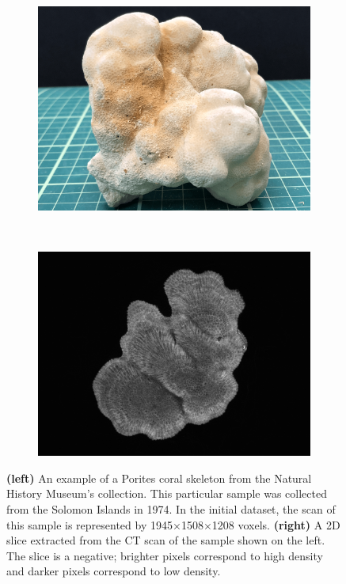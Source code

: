 \begin{figure}[t]
    \centering
    \begin{subfigure}[t]{0.49\textwidth}
        \centering
        \includegraphics[width=1\textwidth, valign=c]{images/real-coral.png}
    \end{subfigure}
    ~
    \begin{subfigure}[t]{0.49\textwidth}
        \centering
        \includegraphics[width=1\textwidth, valign=c]{images/slice-example.png}
    \end{subfigure}
    \caption{\textbf{(left)} An example of a Porites coral skeleton from the Natural History Museum's collection. This particular sample was collected from the Solomon Islands in 1974. In the initial dataset, the scan of this sample is represented by 1945$\times$1508$\times$1208 voxels. \textbf{(right)} A 2D slice extracted from the CT scan of the sample shown on the left. The slice is a negative; brighter pixels correspond to high density and darker pixels correspond to low density.}
    \label{fig:scanexample}
\end{figure}


